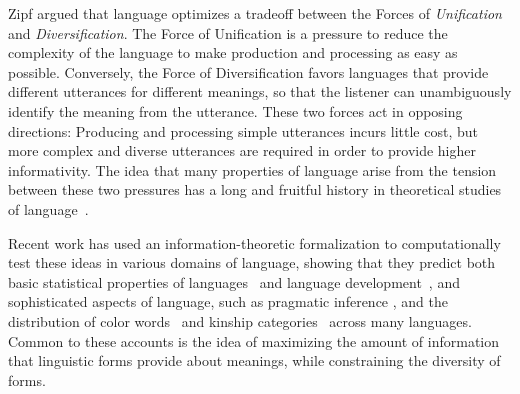 \documentclass[9pt,twocolumn,twoside,lineno]{pnas-new}
\newcommand{\key}[1]{\textbf{#1}}
\begin{document}



Zipf \cite{zipf1949human} argued that language optimizes a tradeoff between the Forces of \emph{Unification} and \emph{Diversification}.
The Force of Unification is a pressure to reduce the complexity of the language to make production and processing as easy as possible.
Conversely, the Force of Diversification favors languages that provide different utterances for different meanings, so that the listener can unambiguously identify the meaning from the utterance.
These two forces act in opposing directions:
Producing and processing simple utterances incurs little cost, but more complex and diverse utterances are required in order to provide higher informativity.
The idea that many properties of language arise from the tension between these two pressures has a long and fruitful history in theoretical studies of language~\cite{gabelentz1901sprachwissenschaft,horn1984toward, schwartz1997dispersion}.


Recent work has used an information-theoretic formalization to computationally test these ideas in various domains of language, showing that they predict
both basic statistical properties of languages~\cite{ferreri2003least} and language development~\cite{smith2013linguistic},
and sophisticated aspects of language, such as pragmatic inference \cite{frank2012predicting}, and the distribution of color words~\cite{zaslavsky2018efficient} and kinship categories~\cite{kemp2012kinship} across many languages.
Common to these accounts is the idea of maximizing the amount of information that linguistic forms provide about meanings, while constraining the diversity of forms.
\end{document}
